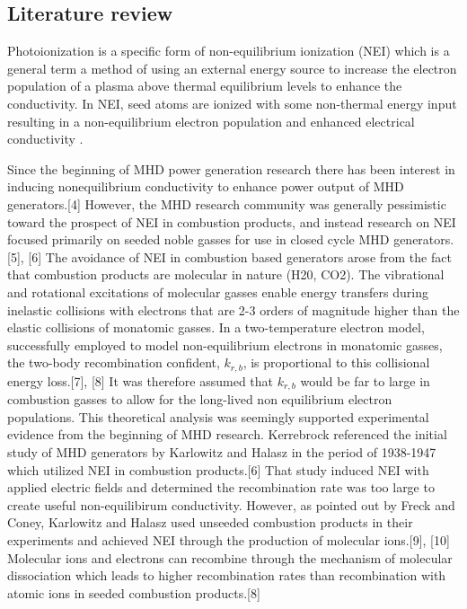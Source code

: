 \subsection{Literature review}

Photoionization is a specific form of non-equilibrium ionization (NEI) which is a general term a method of using an external energy source to increase the electron population of a plasma above thermal equilibrium levels to enhance the conductivity. In NEI, seed atoms are ionized with some non-thermal energy input resulting in a non-equilibrium electron population and enhanced electrical conductivity .

Since the beginning of MHD power generation research there has been interest in inducing nonequilibrium conductivity to enhance power output of MHD generators.[4] However, the MHD research community was generally pessimistic toward the prospect of NEI in combustion products, and instead research on NEI focused primarily on seeded noble gasses for use in closed cycle MHD generators.[5], [6] The avoidance of NEI in combustion based generators arose from the fact that combustion products are molecular in nature (H20, CO2). The vibrational and rotational excitations of molecular gasses enable energy transfers during inelastic collisions with electrons that are 2-3 orders of magnitude higher than the elastic collisions of monatomic gasses. In a two-temperature electron model, successfully employed to model non-equilibrium electrons in monatomic gasses, the two-body recombination confident, $k_{r,b}$, is proportional to this collisional energy loss.[7], [8] It was therefore assumed that $k_{r,b}$ would be far to large in combustion gasses to allow for the long-lived non equilibrium electron populations.
This theoretical analysis was seemingly supported experimental evidence from the beginning of MHD research. Kerrebrock referenced the initial study of MHD generators by Karlowitz and Halasz in the period of 1938-1947 which utilized NEI in combustion products.[6] That study induced NEI with applied electric fields and determined the recombination rate was too large to create useful non-equilibirum conductivity. However, as pointed out by Freck and Coney, Karlowitz and Halasz used unseeded combustion products in their experiments and achieved NEI through the production of molecular ions.[9], [10] Molecular ions and electrons can recombine through the mechanism of molecular dissociation  which leads to higher recombination rates than recombination with atomic ions in seeded combustion products.[8] 
